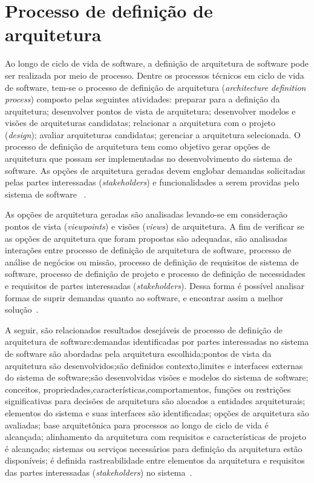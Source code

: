 \section{Processo de definição de arquitetura}

Ao longo de ciclo de vida de software, a definição de arquitetura de software pode ser realizada por meio de processo. Dentre os processos técnicos em ciclo de vida de software, tem-se o processo de definição de arquitetura (\emph{architecture definition process}) composto pelas seguintes atividades: preparar para a definição da arquitetura; desenvolver pontos de vista de arquitetura; desenvolver modelos e visões de arquiteturas candidatas; relacionar a arquitetura com o projeto (\emph{design}); avaliar arquiteturas candidatas; gerenciar a arquitetura selecionada. O processo de definição de arquitetura tem como objetivo gerar opções de arquitetura que possam ser implementadas no desenvolvimento do sistema de software. As opções de arquitetura geradas devem englobar demandas solicitadas pelas partes interessadas (\emph{stakeholders}) e funcionalidades a serem providas pelo sistema de software ~\cite{ISO_12207}.

As opções de arquitetura geradas são analisadas levando-se em consideração pontos de vista (\emph{viewpoints}) e visões (\emph{views}) de arquitetura. A fim de verificar se as opções de arquitetura que foram propostas são adequadas, são analisadas interações entre processo de definição de arquitetura de software, processo de análise de negócios ou missão, processo de definição de requisitos de sistema de software, processo de definição de projeto e processo de definição de necessidades e requisitos de partes interessadas (\emph{stakeholders}). Dessa forma é possível analisar formas de suprir demandas quanto ao software, e encontrar assim a melhor solução~\cite{ISO_12207}. 

A seguir, são relacionados resultados desejáveis de processo de definição de arquitetura de software:demandas identificadas por partes interessadas no sistema de software são abordadas pela arquitetura escolhida;pontos de vista da arquitetura são desenvolvidos;são definidos contexto,limites e interfaces externas do sistema de software;são desenvolvidas visões e modelos do sistema de software; 
conceitos, propriedades,características,comportamentos, 
funções ou restrições significativas para decisões de arquitetura são alocados a entidades arquiteturais; elementos do sistema e suas interfaces são identificadas; opções de arquitetura são avaliadas; base arquitetônica para processos ao longo de ciclo de vida é alcançada; 
alinhamento da arquitetura com requisitos e características de projeto é alcançado; sistemas ou serviços necessários para definição da arquitetura estão disponíveis; 
é definida rastreabilidade entre elementos da arquitetura e requisitos das partes interessadas (\emph{stakeholders}) no sistema~\cite{ISO_12207}.  

